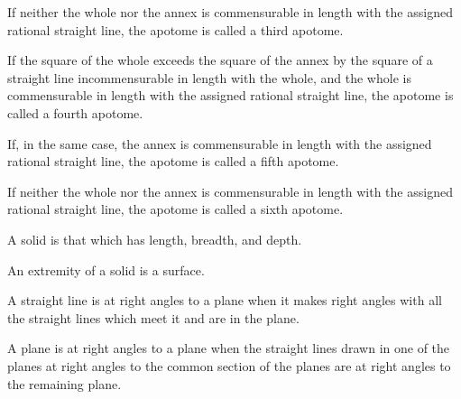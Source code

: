 \documentclass{rrxiv}
\begin{document}
\begin{scope}
\label{def:X.III.3}
If neither the whole nor the annex is commensurable in length with
the assigned rational straight line, the apotome is called a third
apotome.
\end{scope}

\begin{scope}
\label{def:X.III.4}
If the square of the whole exceeds the square of the annex by the
square of a straight line incommensurable in length with the whole,
and the whole is commensurable in length with the assigned rational
straight line, the apotome is called a fourth apotome.
\end{scope}

\begin{scope}
\label{def:X.III.5}
If, in the same case, the annex is commensurable in length with the
assigned rational straight line, the apotome is called a fifth apotome.
\end{scope}

\begin{scope}
\label{def:X.III.6}
If neither the whole nor the annex is commensurable in length with
the assigned rational straight line, the apotome is called a sixth
apotome.
\end{scope}


\begin{scope}
\label{def:XI.1}
A solid is that which has length, breadth, and depth.
\end{scope}

\begin{scope}
\label{def:XI.2}
An extremity of a solid is a surface.
\end{scope}

\begin{scope}
\label{def:XI.3}
A straight line is at right angles to a plane when it makes right
angles with all the straight lines which meet it and are in the plane.
\end{scope}

\begin{scope}
\label{def:XI.4}
A plane is at right angles to a plane when the straight lines drawn
in one of the planes at right angles to the common section of the
planes are at right angles to the remaining plane.
\end{scope}
\end{document}
